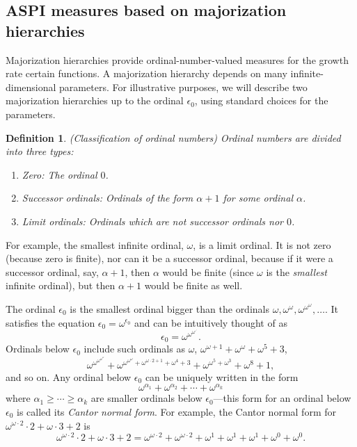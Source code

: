 \documentclass{article}
\newtheorem{definition}[theorem]{Definition}
\begin{document}
\subsection{ASPI measures based on majorization hierarchies}

Majorization hierarchies \cite{weiermann2002slow}
provide ordinal-number-valued measures for the growth
rate certain functions. A majorization hierarchy depends
on many infinite-dimensional parameters. For illustrative purposes,
we will describe two majorization hierarchies up to the ordinal $\epsilon_0$,
using standard choices for the parameters.

\begin{definition}
    (Classification of ordinal numbers)
    Ordinal numbers are divided into three types:
    \begin{enumerate}
        \item Zero: The ordinal $0$.
        \item Successor ordinals: Ordinals of the form $\alpha+1$ for some ordinal $\alpha$.
        \item Limit ordinals: Ordinals which are not successor ordinals nor $0$.
    \end{enumerate}
\end{definition}

For example, the smallest infinite ordinal, $\omega$, is a limit ordinal. It is not zero
(because zero is finite),
nor can it be a successor ordinal, because if it were a successor ordinal, say, $\alpha+1$,
then $\alpha$ would be finite (since $\omega$ is the \emph{smallest} infinite ordinal),
but then $\alpha+1$ would be finite as well.

The ordinal $\epsilon_0$ is the smallest ordinal bigger than the ordinals
$\omega,\omega^\omega,\omega^{\omega^\omega},\ldots$. It satisfies the equation
$\epsilon_0=\omega^{\epsilon_0}$ and can be intuitively thought of as
\[
    \epsilon_0 = \omega^{\omega^{\omega^{\iddots}}}.
\]
Ordinals below $\epsilon_0$ include such ordinals as $\omega$,
$\omega^{\omega+1}+\omega^{\omega}+\omega^5+3$,
\[
\omega^{\omega^{\omega^{\omega^\omega}}}+
\omega^{\omega^{\omega^\omega}+\omega^{\omega\cdot 2+1}+\omega^4 + 3}
+ \omega^{\omega^5+\omega^3}+\omega^8+1,
\]
and so on.
Any ordinal below $\epsilon_0$ can be uniquely written in the form
\[
    \omega^{\alpha_1}+\omega^{\alpha_2}+\cdots + \omega^{\alpha_k}
\]
where $\alpha_1\geq\cdots\geq\alpha_k$ are smaller ordinals below $\epsilon_0$---this form
for an ordinal below $\epsilon_0$ is called its \emph{Cantor normal form}.
For example, the Cantor normal form for $\omega^{\omega\cdot 2}\cdot 2+\omega\cdot 3+2$
is
\[
\omega^{\omega\cdot 2}\cdot 2+\omega\cdot 3+2
=
\omega^{\omega\cdot 2} + \omega^{\omega\cdot 2} + \omega^1 + \omega^1 + \omega^1
+\omega^0 + \omega^0.
\]
\end{document}
